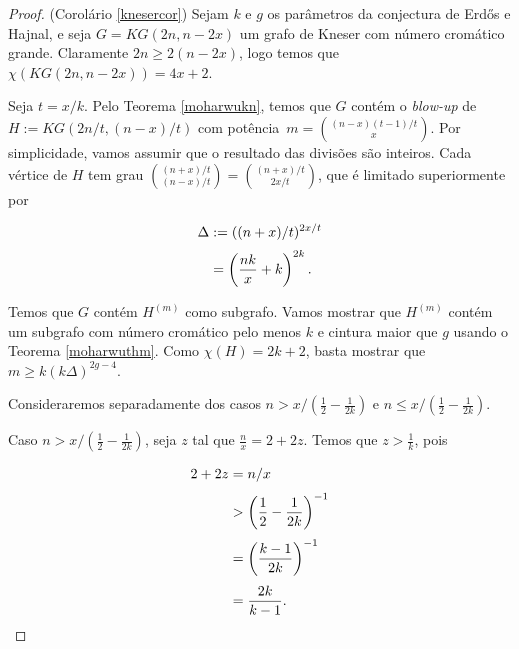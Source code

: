 \begin{proof}{(Corolário \ref{knesercor})}
Sejam $k$ e $g$ os parâmetros da conjectura de Erd\H{o}s e Hajnal, e seja $G = KG(2n,n-2x)$ um grafo de Kneser com número cromático grande. Claramente $2n \geq 2(n-2x)$, logo temos que $\chi(KG(2n,n-2x)) = 4x+2$.
 


Seja $t = x/k$. Pelo Teorema \ref{moharwukn}, temos que $G$ contém o \textit{blow-up} de $H := KG(2n/t, (n-x)/t)$ com potência~$m = \binom{(n-x)(t-1)/t}{x}$. Por simplicidade, vamos assumir que o resultado das divisões são inteiros. Cada vértice de $H$ tem grau $\binom{(n+x)/t}{(n-x)/t} = \binom{(n+x)/t}{2x/t}$, que é limitado superiormente por

\begin{equation*}
\setlength{\jot}{5pt}
\begin{aligned}
\Delta &:= ((n+x)/t)^{2x/t} \\
&= \left(\frac{nk}{x} + k\right)^{2k}.
\end{aligned}
\end{equation*}

Temos que $G$ contém $H^{(m)}$ como subgrafo. Vamos mostrar que $H^{(m)}$ contém um subgrafo com número cromático pelo menos $k$ e cintura maior que $g$ usando o Teorema \ref{moharwuthm}. Como $\chi(H) = 2k+2$, basta mostrar que $m\geq k(k\Delta)^{2g-4}$.

Consideraremos separadamente dos casos $n > x/(\frac{1}{2} - \frac{1}{2k})$ e $n \leq x/(\frac{1}{2} - \frac{1}{2k})$.

Caso $n > x/(\frac{1}{2} - \frac{1}{2k})$, seja $z$ tal que $\frac{n}{x} = 2 + 2z$. Temos que $z > \frac{1}{k}$, pois

\begin{equation*}
\setlength{\jot}{6pt}
\begin{aligned}
2+2z &= n/x \\
& > \left(\frac{1}{2} - \frac{1}{2k}\right)^{-1}\\
& = \left(\frac{k-1}{2k}\right)^{-1}\\
& = \frac{2k}{k-1}.
\end{aligned}
\end{equation*}


\end{proof}
